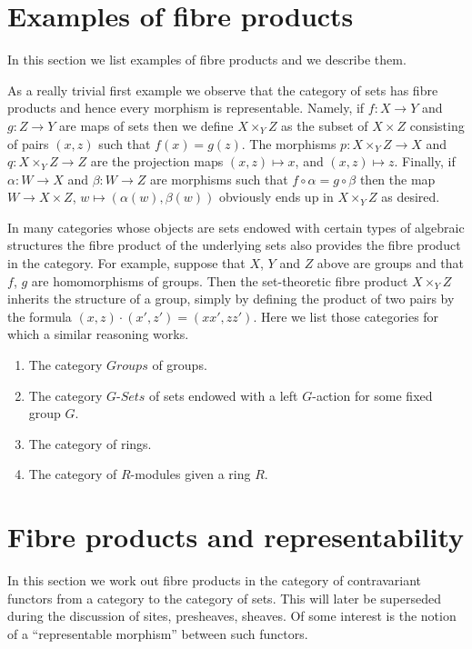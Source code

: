 \section{Examples of fibre products}
\label{section-example-fibre-products}

\noindent
In this section we list examples of fibre products and
we describe them.

\medskip\noindent
As a really trivial first example we observe
that the category of sets has fibre products and hence every
morphism is representable. Namely, if $f : X \to Y$
and $g : Z \to Y$ are maps of sets then we define
$X \times_Y Z$ as the subset of $X \times Z$ consisting
of pairs $(x, z)$ such that $f(x) = g(z)$. The morphisms
$p : X \times_Y Z \to X$ and $q : X \times_Y Z \to Z$ are
the projection maps $(x, z) \mapsto x$, and $(x, z) \mapsto z$.
Finally, if $\alpha : W \to X$ and $\beta : W \to Z$
are morphisms such that $f \circ \alpha = g \circ \beta$
then the map $W \to X \times Z$, $w\mapsto (\alpha(w), \beta(w))$
obviously ends up in $X \times_Y Z$ as desired.

\medskip\noindent
In many categories whose objects are sets endowed with certain types of
algebraic structures the fibre product of the underlying sets also
provides the fibre product in the category. For example, suppose
that $X$, $Y$ and $Z$ above are groups and that $f$, $g$ are
homomorphisms of groups. Then the set-theoretic fibre product
$X \times_Y Z$ inherits the structure of a group, simply by
defining the product of two pairs by the formula
$(x, z) \cdot (x', z') = (xx', zz')$. Here we list those categories
for which a similar reasoning works.
\begin{enumerate}
\item The category $\textit{Groups}$ of groups.
\item The category $G\textit{-Sets}$ of sets
endowed with a left $G$-action for some fixed group $G$.
\item The category of rings.
\item The category of $R$-modules given a ring $R$.
\end{enumerate}




\section{Fibre products and representability}
\label{section-representable-map-presheaves}

\noindent
In this section we work out fibre products in the
category of contravariant functors from a category
to the category of sets. This will later be superseded
during the discussion of sites, presheaves, sheaves. Of some
interest is the notion of a ``representable morphism'' between
such functors.

